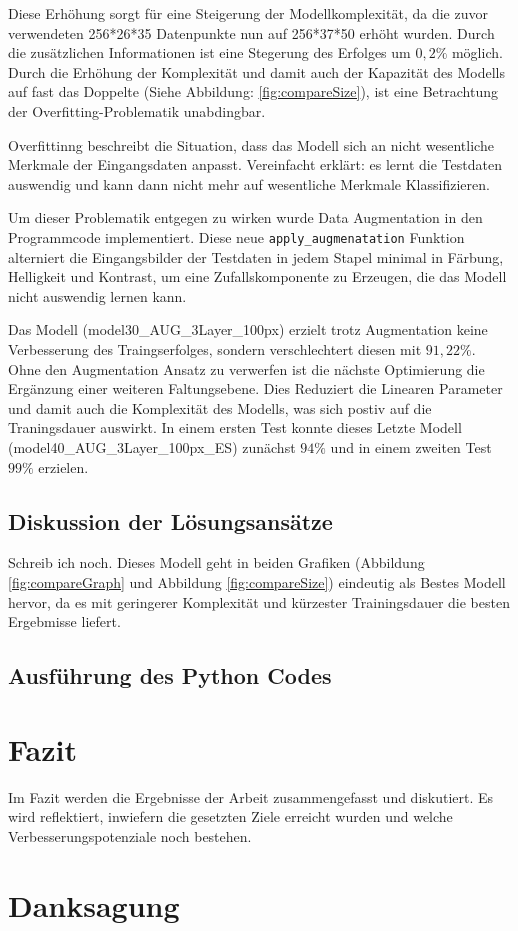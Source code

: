 \documentclass[journal,twoside,web]{ieeecolor}
\begin{document}
Diese Erhöhung sorgt für eine Steigerung der Modellkomplexität, da die zuvor verwendeten 256*26*35 Datenpunkte nun auf 256*37*50 erhöht wurden. 
Durch die zusätzlichen Informationen ist eine Stegerung des Erfolges um $0,2\%$ möglich. Durch die Erhöhung der Komplexität und damit auch der Kapazität des Modells auf fast das Doppelte (Siehe Abbildung: \ref{fig:compareSize}), ist eine Betrachtung der Overfitting-Problematik unabdingbar.

Overfittinng beschreibt die Situation, dass das Modell sich an nicht wesentliche Merkmale der Eingangsdaten anpasst. Vereinfacht erklärt: es lernt die Testdaten auswendig und kann dann nicht mehr auf wesentliche Merkmale Klassifizieren.

Um dieser Problematik entgegen zu wirken wurde Data Augmentation in den Programmcode implementiert. 
Diese neue \texttt{apply\_augmenatation} Funktion alterniert die Eingangsbilder der Testdaten in jedem Stapel minimal in Färbung, Helligkeit und Kontrast, um eine Zufallskomponente zu Erzeugen, die das Modell nicht auswendig lernen kann. 

Das Modell (model30\_AUG\_3Layer\_100px) erzielt trotz Augmentation keine Verbesserung des Traingserfolges, sondern verschlechtert diesen mit $91,22\%$. 
Ohne den Augmentation Ansatz zu verwerfen ist die nächste Optimierung die Ergänzung einer weiteren Faltungsebene. 
Dies Reduziert die Linearen Parameter und damit auch die Komplexität des Modells, was sich postiv auf die Traningsdauer auswirkt. 
In einem ersten Test konnte dieses Letzte Modell (model40\_AUG\_3Layer\_100px\_ES) zunächst $94\%$ und in einem zweiten Test $99\%$ erzielen.

\subsection{Diskussion der Lösungsansätze}
Schreib ich noch.
Dieses Modell geht in beiden Grafiken (Abbildung \ref{fig:compareGraph} und Abbildung \ref{fig:compareSize}) eindeutig als Bestes Modell hervor, da es mit geringerer Komplexität und kürzester Trainingsdauer die besten Ergebmisse liefert.


\subsection{Ausführung des Python Codes}


\section{Fazit}
Im Fazit werden die Ergebnisse der Arbeit zusammengefasst und diskutiert. Es wird reflektiert, inwiefern die gesetzten Ziele erreicht wurden und welche Verbesserungspotenziale noch bestehen.








\appendices


\section*{Danksagung}
\end{document}
